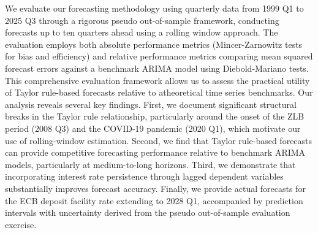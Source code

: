 \par We evaluate our forecasting methodology using quarterly data from 1999 Q1 to 2025 Q3 through a rigorous pseudo out-of-sample framework, conducting forecasts up to ten quarters ahead using a rolling window approach. The evaluation employs both absolute performance metrics (Mincer-Zarnowitz tests for bias and efficiency) and relative performance metrics comparing mean squared forecast errors against a benchmark ARIMA model using Diebold-Mariano tests. This comprehensive evaluation framework allows us to assess the practical utility of Taylor rule-based forecasts relative to atheoretical time series benchmarks. Our analysis reveals several key findings. First, we document significant structural breaks in the Taylor rule relationship, particularly around the onset of the ZLB period (2008 Q3) and the COVID-19 pandemic (2020 Q1), which motivate our use of rolling-window estimation. Second, we find that Taylor rule-based forecasts can provide competitive forecasting performance relative to benchmark ARIMA models, particularly at medium-to-long horizons. Third, we demonstrate that incorporating interest rate persistence through lagged dependent variables substantially improves forecast accuracy. Finally, we provide actual forecasts for the ECB deposit facility rate extending to 2028 Q1, accompanied by prediction intervals with uncertainty derived from the pseudo out-of-sample evaluation exercise.

